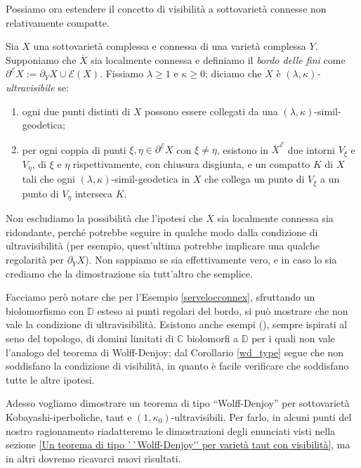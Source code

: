 Possiamo ora estendere il concetto di visibilità a sottovarietà connesse non relativamente compatte.

\begin{defn} \label{ultravisibility}
    Sia $X$ una sottovarietà complessa e connessa di una varietà complessa $Y$. Supponiamo che $\overline{X}$ sia localmente connessa e definiamo il \textit{bordo delle fini} come ${\partial^\mathcal{E}X:=\partial_YX\cup\mathcal{E}(X)}$. Fissiamo $\lambda \ge 1$ e $\kappa \ge 0$; diciamo che $X$ è \textit{$(\lambda,\kappa)$-ultravisibile} se:
    \begin{enumerate}
        \item ogni due punti distinti di $X$ possono essere collegati da una $(\lambda,\kappa)$-simil-geodetica;
        \item per ogni coppia di punti $\xi,\eta\in\partial^\mathcal{E}X$ con $\xi\not=\eta$, esistono in $\overline{X}^\mathcal{E}$ due intorni $V_\xi$ e $V_\eta$, di $\xi$ e $\eta$ rispettivamente, con chiusura disgiunta, e un compatto $K$ di $X$ tali che  ogni $(\lambda,\kappa)$-simil-geodetica in $X$ che collega un punto di $V_\xi$ a un punto di $V_\eta$ interseca $K$.
    \end{enumerate}
\end{defn}

\begin{oss}
    Non escludiamo la possibilità che l'ipotesi che $\overline{X}$ sia localmente connessa sia ridondante, perché potrebbe seguire in qualche modo dalla condizione di ultravisibilità (per esempio, quest'ultima potrebbe implicare una qualche regolarità per $\partial_YX$). Non sappiamo se sia effettivamente vero, e in caso lo sia crediamo che la dimostrazione sia tutt'altro che semplice.
    
    Facciamo però notare che per l'Esempio \ref{servelocconnex}, sfruttando un biolomorfismo con $\mathbb{D}$ esteso ai punti regolari del bordo, si può mostrare che non vale la condizione di ultravisibilità. Esistono anche esempi (\cite[Example 3.3.8]{A6}), sempre ispirati al seno del topologo, di domini limitati di $\mathbb{C}$ biolomorfi a $\mathbb{D}$ per i quali non vale l'analogo del teorema di Wolff-Denjoy; dal Corollario \ref{wd_type} segue che non soddisfano la condizione di visibilità, in quanto è facile verificare che soddisfano tutte le altre ipotesi.
\end{oss}

Adesso vogliamo dimostrare un teorema di tipo ``Wolff-Denjoy'' per sottovarietà Kobayashi-iperboliche, taut e $(1,\kappa_0)$-ultravisibili. Per farlo, in alcuni punti del nostro ragionamento riadatteremo le dimostrazioni degli enunciati visti nella sezione \ref{Un teorema di tipo ``Wolff-Denjoy'' per varietà taut con visibilità}, ma in altri dovremo ricavarci nuovi risultati.

